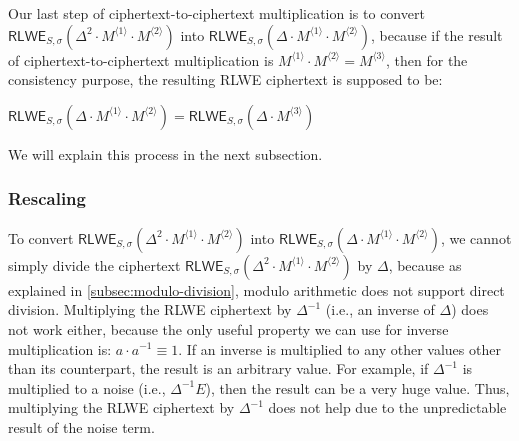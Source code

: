 $ $

$ $

Our last step of ciphertext-to-ciphertext multiplication is to convert $\textsf{RLWE}_{S, \sigma}(\Delta^2 \cdot M^{\langle 1 \rangle} \cdot M^{\langle 2 \rangle})$ into $\textsf{RLWE}_{S, \sigma}(\Delta \cdot M^{\langle 1 \rangle} \cdot M^{\langle 2 \rangle})$, because if the result of ciphertext-to-ciphertext multiplication is $M^{\langle 1 \rangle} \cdot M^{\langle 2 \rangle} = M^{\langle 3 \rangle}$, then for the consistency purpose, the resulting RLWE ciphertext is supposed to be: 

$\textsf{RLWE}_{S, \sigma}(\Delta \cdot M^{\langle 1 \rangle} \cdot M^{\langle 2 \rangle}) = \textsf{RLWE}_{S, \sigma}(\Delta \cdot M^{\langle 3 \rangle})$

We will explain this process in the next subsection. 


\subsubsection{Rescaling}
\label{subsubsec:ckks-mult-cipher-rescale}

To convert $\textsf{RLWE}_{S, \sigma}(\Delta^2 \cdot M^{\langle 1 \rangle} \cdot M^{\langle 2 \rangle})$ into $\textsf{RLWE}_{S, \sigma}(\Delta \cdot M^{\langle 1 \rangle} \cdot M^{\langle 2 \rangle})$, we cannot simply divide the ciphertext $\textsf{RLWE}_{S, \sigma}(\Delta^2 \cdot M^{\langle 1 \rangle} \cdot M^{\langle 2 \rangle})$ by $\Delta$, because as explained in \autoref{subsec:modulo-division}, modulo arithmetic does not support direct division. Multiplying the RLWE ciphertext by $\Delta^{-1}$ (i.e., an inverse of $\Delta$) does not work either, because the only useful property we can use for inverse multiplication is: $a \cdot a^{-1} \equiv 1$. If an inverse is multiplied to any other values other than its counterpart, the result is an arbitrary value. For example, if $\Delta^{-1}$ is multiplied to a noise (i.e., $\Delta^{-1}E$), then the result can be a very huge value. Thus, multiplying the RLWE ciphertext by $\Delta^{-1}$ does not help due to the unpredictable result of the noise term. 

